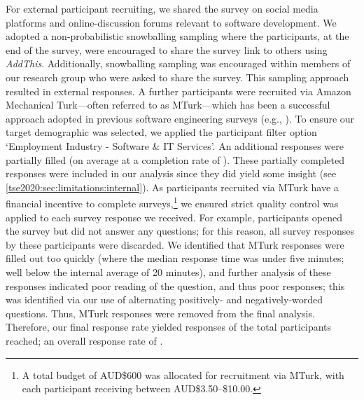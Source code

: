 For external participant recruiting, we shared the survey on social media platforms and online-discussion forums relevant to software development. We adopted a non-probabilistic snowballing sampling where the participants, at the end of the survey, were encouraged to share the survey link to others using \textit{AddThis}. Additionally, snowballing sampling was encouraged within members of our research group who were asked to share the survey. This sampling approach resulted in \SurveyParticipantsExternalSnowball{} external responses. A further \SurveyParticipantsExternalMTurk{} participants were recruited via Amazon Mechanical Turk---often referred to as MTurk---which has been a successful approach adopted in previous software engineering surveys (e.g., \citep{Jiarpakdee2020}). To ensure our target demographic was selected, we applied the participant filter option `Employment Industry - Software \& IT Services'.
An additional \SurveyParticipantsExternalPartialResponses{} responses were partially filled (on average at a completion rate of \SurveyParticipantsExternalPartialResponsesCompletionRate{}). These partially completed responses were included in our analysis since they did yield some insight (see \cref{tse2020:sec:limitations:internal}).
As participants recruited via MTurk have a financial incentive to complete surveys,\footnote{A total budget of AUD\$600 was allocated for recruitment via MTurk, with each participant receiving between AUD\$3.50--\$10.00.} we ensured strict quality control was applied to each survey response we received. For example, \SurveyParticipantsExternalResponseTooSmall{} participants opened the survey but did not answer any questions; for this reason, all survey responses by these participants were discarded. We identified that \SurveyParticipantsExternalMTurkRejected{} MTurk responses were filled out too quickly (where the median response time was under five minutes; well below the internal average of 20 minutes), and further analysis of these \SurveyParticipantsExternalMTurkRejected{} responses indicated poor reading of the question, and thus poor responses; this was identified via our use of alternating positively- and negatively-worded questions. Thus, \SurveyParticipantsExternalMTurkRejected{} MTurk responses were removed from the final analysis. Therefore, our final response rate yielded \SurveyParticipantsTotal{} responses of the total \SurveyParticipantsTotalReached{} participants reached; an overall response rate of \SurveyParticipantsTotalResponseRate{}.

